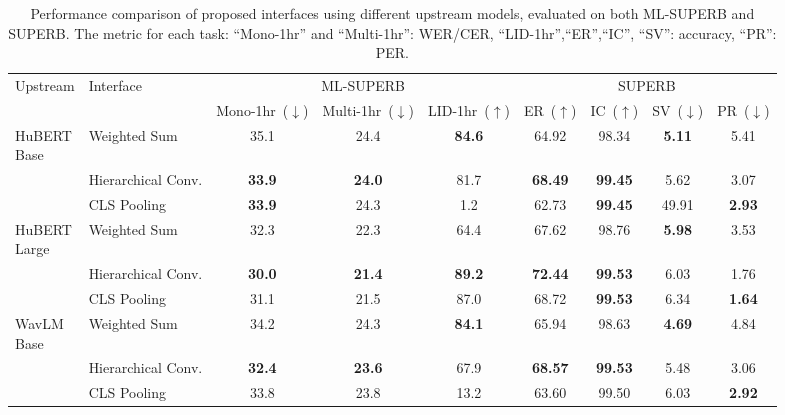 \begin{table}[th]
  \caption{Performance comparison of proposed interfaces using different upstream models, evaluated on both ML-SUPERB and SUPERB. The metric for each task: 
  ``Mono-1hr'' and ``Multi-1hr'': WER/CER,
  ``LID-1hr'',``ER'',``IC'', ``SV'': accuracy,
  ``PR'': PER.
  }
  \label{tab:full_results}
  \centering
  \begin{tabular}{ l l c c c c c c c }
    \toprule
    \multirow{ 2}{*}{Upstream}  & \multirow{ 2}{*}{Interface} & \multicolumn{3}{c}{ML-SUPERB} & \multicolumn{4}{c}{SUPERB}   \\
    &  & Mono-1hr~($\downarrow$) & Multi-1hr~($\downarrow$)  & LID-1hr~($\uparrow$)
    & ER~($\uparrow$) & IC~($\uparrow$) & SV~($\downarrow$) & PR~($\downarrow$) \\
    \midrule
    \multirowcell{ 3}{HuBERT\\Base} 
    &  Weighted Sum  &	35.1 & 24.4 & \textbf{84.6} & 64.92 & 98.34 & \textbf{5.11} & 5.41 \\
    &  Hierarchical Conv.  &	\textbf{33.9} & \textbf{24.0} & 81.7 & \textbf{68.49} & \textbf{99.45} & 5.62 & 3.07\\
    &  CLS Pooling &	\textbf{33.9} & 24.3 & 1.2 & 62.73 & \textbf{99.45} & 49.91 & \textbf{2.93} \\
    \midrule

    \multirowcell{ 3}{HuBERT\\Large} 
    &  Weighted Sum         &	32.3 & 22.3 & 64.4 & 67.62 & 98.76 & \textbf{5.98} & 3.53 \\
    &  Hierarchical Conv.    &	\textbf{30.0} & \textbf{21.4} & \textbf{89.2} & \textbf{72.44} & \textbf{99.53} & 6.03 & 1.76 \\
    &  CLS Pooling           &	31.1 & 21.5 & 87.0 & 68.72 & \textbf{99.53} & 6.34 & \textbf{1.64} \\
    \midrule



    \multirowcell{ 3}{WavLM\\Base} 
    &  Weighted Sum  &	34.2 & 24.3 & \textbf{84.1} & 65.94 & 98.63 & \textbf{4.69} & 4.84 \\
    &  Hierarchical Conv.  &	\textbf{32.4} & \textbf{23.6} & 67.9 & \textbf{68.57} & \textbf{99.53} & 5.48 & 3.06\\
    &  CLS Pooling  &	33.8 & 23.8 & 13.2 & 63.60 & 99.50 & 6.03 & \textbf{2.92}\\
    \midrule


\end{tabular}
\end{table}
